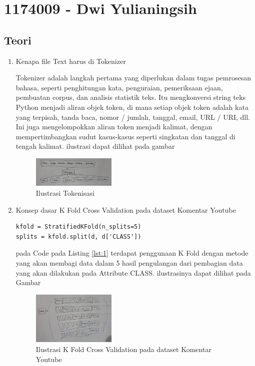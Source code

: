 \section{1174009 - Dwi Yulianingsih}
\subsection{Teori}
\begin{enumerate}
\item Kenapa file Text harus di Tokenizer
\par Tokenizer adalah langkah pertama yang diperlukan dalam tugas pemrosesan bahasa, seperti penghitungan kata, penguraian, pemeriksaan ejaan, pembuatan corpus, dan analisis statistik teks. Itu mengkonversi string teks Python menjadi aliran objek token, di mana setiap objek token adalah kata yang terpisah, tanda baca, nomor / jumlah, tanggal, email, URL / URI, dll. Ini juga mengelompokkan aliran token menjadi kalimat, dengan mempertimbangkan sudut kasus-kasus seperti singkatan dan tanggal di tengah kalimat. ilustrasi dapat dilihat pada gambar

\begin{figure}[H]
    \includegraphics[width=4cm]{figures/1174009/chapter7/teori1.jpeg}
    \centering
      \caption{Ilustrasi Tokenisasi}
\end{figure}

\item Konsep dasar K Fold Cross Validation pada dataset Komentar Youtube

\begin{lstlisting}[caption=K Fold Cross Validation,label={lst:1}]
kfold = StratifiedKFold(n_splits=5)
splits = kfold.split(d, d['CLASS'])
\end{lstlisting}

\par pada Code pada Listing \ref{lst:1} terdapat penggunaan K Fold dengan metode yang akan membagi data dalam 5 hasil pengulangan dari pembagian data yang akan dilakukan pada Attribute CLASS. ilustrasinya dapat dilihat pada Gambar

\begin{figure}[H]
    \includegraphics[width=4cm]{figures/1174009/chapter7/teori2.jpeg}
    \centering
      \caption{Ilustrasi  K Fold Cross Validation pada dataset Komentar Youtube}
\end{figure}


\end{enumerate}
